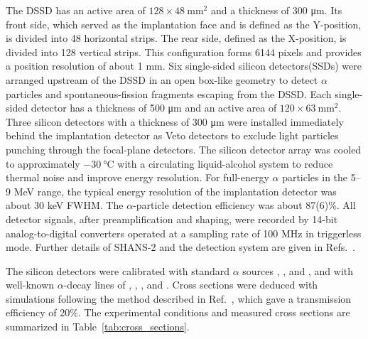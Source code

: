\documentclass[aps,prc,reprint,superscriptaddress,floatfix]{revtex4-2}
\begin{document}
The DSSD has an active area of $128 \times 48\ \mathrm{mm}^{2}$ and a thickness of 300 \si{\um}. Its front side, which served as the implantation face and is defined as the Y-position, is divided into 48 horizontal strips. 
The rear side, defined as the X-position, is divided into 128 vertical strips. This configuration forms 6144 pixels and provides a position resolution of about 1 mm. 
Six single-sided silicon detectors(SSDs) were arranged upstream of the DSSD in an open box-like geometry to detect $\alpha$ particles and spontaneous-fission fragments escaping from the DSSD. 
Each single-sided detector has a thickness of 500 \si{\um} and an active area of $120 \times 63\ \mathrm{mm}^{2}$. 
Three silicon detectors with a thickness of 300 \si{\um} were installed immediately behind the implantation detector as Veto detectors to exclude light particles punching through the focal-plane detectors. 
The silicon detector array was cooled to approximately $\SI{-30}{\celsius}$ with a circulating liquid-alcohol system to reduce thermal noise and improve energy resolution. 
For full-energy $\alpha$ particles in the 5--9 MeV range, the typical energy resolution of the implantation detector was about 30 keV FWHM. The $\alpha$-particle detection efficiency was about 87(6)\%. 
All detector signals, after preamplification and shaping, were recorded by 14-bit analog-to-digital converters operated at a sampling rate of 100 MHz in triggerless mode. Further details of SHANS-2 and the detection system are given in Refs.~\cite{xu2023GasfilledRecoilSeparator,sheng2021IonopticalDesignMultiparticle}.

The silicon detectors were calibrated with standard $\alpha$ sources , , and , and with well-known $\alpha$-decay lines of  \cite{SINGH2019405},  \cite{ZHU20211a},  \cite{WU20071057}, and  \cite{KONDEV2018382}.
Cross sections were deduced with simulations following the method described in Ref.~\cite{zhang2026MonteCarloSimulation}, which gave a transmission efficiency of 20\%. 
The experimental conditions and measured cross sections are summarized in Table~\ref{tab:cross_sections}.
\end{document}
